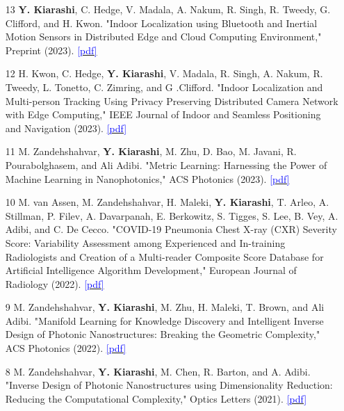 \documentclass[margin, line]{res}
\newenvironment{list1}{
  \begin{list}{\ding{113}}{%
      \setlength{\itemsep}{0in}
      \setlength{\parsep}{0in} \setlength{\parskip}{0in}
      \setlength{\topsep}{0in} \setlength{\partopsep}{0in} 
      \setlength{\leftmargin}{0.17in}}}{\end{list}}
\begin{document}
\begin{resume}
\begin{list1}
\begin{itemize}
    \item [13]  \textbf{Y. Kiarashi}, C. Hedge, V. Madala, A. Nakum, R. Singh, R. Tweedy, G. Clifford, and H. Kwon. "Indoor Localization using Bluetooth and Inertial Motion Sensors in Distributed Edge and Cloud Computing Environment," Preprint (2023). \href{https://arxiv.org/abs/2305.19342}{\textcolor{blue}{[pdf]}}

    \item [12]  H. Kwon, C. Hedge, \textbf{Y. Kiarashi}, V. Madala, R. Singh, A. Nakum, R. Tweedy, L. Tonetto, C. Zimring, and G .Clifford. "Indoor Localization and Multi-person Tracking Using Privacy Preserving Distributed Camera Network with Edge Computing," IEEE Journal of Indoor and Seamless Positioning and Navigation (2023). \href{https://ieeexplore.ieee.org/abstract/document/10329418}{\textcolor{blue}{[pdf]}}
    
    \item [11] M. Zandehshahvar, \textbf{Y. Kiarashi}, M. Zhu, D. Bao, M. Javani, R. Pourabolghasem, and Ali Adibi. "Metric Learning: Harnessing the Power of Machine Learning in Nanophotonics," ACS Photonics (2023). \href{https://pubs.acs.org/doi/abs/10.1021/acsphotonics.2c01331}{\textcolor{blue}{[pdf]}}
    
    \item [10] M. van Assen, M. Zandehshahvar, H. Maleki, \textbf{Y. Kiarashi}, T. Arleo, A. Stillman, P. Filev, A. Davarpanah, E. Berkowitz, S. Tigges, S. Lee, B.  Vey, A. Adibi, and C. De Cecco. "COVID-19 Pneumonia Chest X-ray (CXR) Severity Score: Variability Assessment among Experienced and In-training Radiologists and Creation of a Multi-reader Composite Score Database for Artificial Intelligence Algorithm Development," European Journal of Radiology (2022). \href{https://www.birpublications.org/doi/full/10.1259/bjr.20211028}{\textcolor{blue}{[pdf]}}
    \item [9] M. Zandehshahvar, \textbf{Y. Kiarashi}, M. Zhu, H. Maleki, T. Brown, and Ali Adibi. "Manifold Learning for Knowledge Discovery and Intelligent Inverse Design of Photonic Nanostructures: Breaking the Geometric Complexity," ACS Photonics (2022). \href{https://pubs.acs.org/doi/full/10.1021/acsphotonics.1c01888}{\textcolor{blue}{[pdf]}}
    
    \item [8] M. Zandehshahvar, \textbf{Y. Kiarashi}, M. Chen, R. Barton, and A. Adibi. "Inverse Design of Photonic Nanostructures using Dimensionality Reduction: Reducing the Computational Complexity," Optics Letters (2021). \href{https://www.osapublishing.org/viewmedia.cfm?r=1&rwjcode=ol&uri=ol-46-11-2634&html=true}{\textcolor{blue}{[pdf]}}
    

\end{itemize}
\end{list1}
\end{resume}
\end{document}
